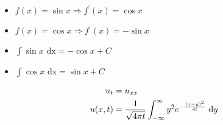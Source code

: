 \begin{itemize}
\item $f(x) = \sin x \Rightarrow f^\prime(x) =   \cos x$
\item $f(x) = \cos x \Rightarrow f^\prime(x) = - \sin x$
\item $\int \sin x \text{ dx} = - \cos x + C$
\item $\int \cos x \text{ dx} =   \sin x + C$
\end{itemize}

%
\begin{align}
u_t & = u_{xx}\\
u(x, t)
& = \frac{1}{\sqrt{4 \pi t}} \int^\infty_{-\infty}
y^2 e^{-\frac{(x - y)^2}{4t}}\ \text dy
\end{align}
